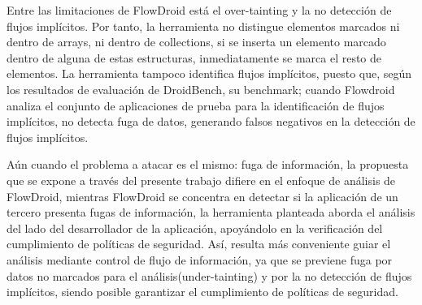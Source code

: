 Entre las limitaciones de FlowDroid está el over-tainting y la no detección
de flujos implícitos. Por tanto, la herramienta no distingue elementos marcados
ni dentro de arrays, ni dentro de collections, si se inserta un elemento marcado
dentro de alguna de estas estructuras, inmediatamente se marca el resto de
elementos. La herramienta tampoco identifica flujos implícitos,    
puesto que, según los resultados de evaluación de
DroidBench\cite{DroidBenchBenchmarks}, su benchmark; cuando Flowdroid analiza el
conjunto de aplicaciones de prueba para la identificación de flujos implícitos, no
detecta fuga de datos, generando falsos negativos en la detección de flujos
implícitos\cite[pags 32-36]{FlowDroid-Thesis}.

Aún cuando el problema a atacar es el mismo: fuga de información, la propuesta
que se expone a través del presente trabajo difiere en el enfoque de análisis de
FlowDroid, mientras FlowDroid se concentra en detectar si la aplicación de un
tercero presenta fugas de información, la herramienta planteada aborda el
análisis del lado del desarrollador de la aplicación, apoyándolo en
la verificación del cumplimiento de políticas de seguridad. Así, resulta más
conveniente guiar el análisis mediante control de flujo de información, ya que
se previene fuga por datos no marcados para el análisis(under-tainting) y por
la no detección de flujos implícitos, siendo posible garantizar el cumplimiento
de políticas de seguridad.
 
